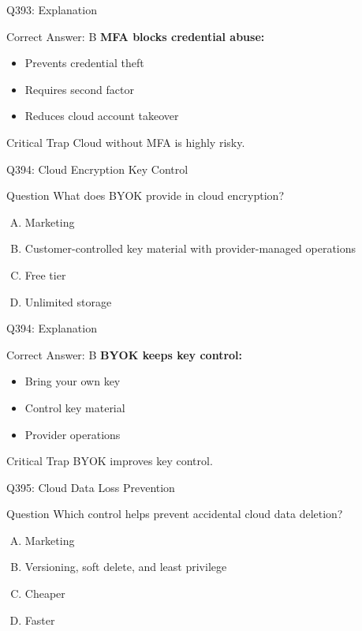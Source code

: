 \documentclass{beamer}
\begin{document}
	\begin{frame}{Q393: Explanation}
		\begin{block}{Correct Answer: B}
			\textbf{MFA blocks credential abuse:}
			\begin{itemize}
				\item Prevents credential theft
				\item Requires second factor
				\item Reduces cloud account takeover
			\end{itemize}
		\end{block}
		\begin{alertblock}{Critical Trap}
			Cloud without MFA is highly risky.
		\end{alertblock}
	\end{frame}
	
	\begin{frame}{Q394: Cloud Encryption Key Control}
		\begin{block}{Question}
			What does BYOK provide in cloud encryption?
		\end{block}
		\begin{enumerate}[(A)]
			\item Marketing
			\item Customer-controlled key material with provider-managed operations
			\item Free tier
			\item Unlimited storage
		\end{enumerate}
	\end{frame}
	
	\begin{frame}{Q394: Explanation}
		\begin{block}{Correct Answer: B}
			\textbf{BYOK keeps key control:}
			\begin{itemize}
				\item Bring your own key
				\item Control key material
				\item Provider operations
			\end{itemize}
		\end{block}
		\begin{alertblock}{Critical Trap}
			BYOK improves key control.
		\end{alertblock}
	\end{frame}
	
	\begin{frame}{Q395: Cloud Data Loss Prevention}
		\begin{block}{Question}
			Which control helps prevent accidental cloud data deletion?
		\end{block}
		\begin{enumerate}[(A)]
			\item Marketing
			\item Versioning, soft delete, and least privilege
			\item Cheaper
			\item Faster
		\end{enumerate}
	\end{frame}
	
\end{document}
